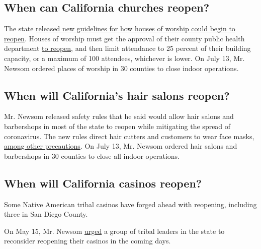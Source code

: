 \hypertarget{when-can-california-churches-reopen}{%
\subsection{When can California churches
reopen?}\label{when-can-california-churches-reopen}}

The state
\href{https://covid19.ca.gov/pdf/guidance-places-of-worship.pdf}{released
new guidelines for how houses of worship could begin to reopen}. Houses
of worship must get the approval of their county public health
department
\href{https://www.nytimes3xbfgragh.onion/2020/05/25/world/coronavirus-news-cases-deaths.html\#link-8d1a66e}{to
reopen}, and then limit attendance to 25 percent of their building
capacity, or a maximum of 100 attendees, whichever is lower. On July 13,
Mr. Newsom ordered places of worship in 30 counties to close indoor
operations.

\hypertarget{when-will-californias-hair-salons-reopen}{%
\subsection{When will California's hair salons
reopen?}\label{when-will-californias-hair-salons-reopen}}

Mr. Newsom released safety rules that he said would allow hair salons
and barbershops in most of the state to reopen while mitigating the
spread of coronavirus. The new rules direct hair cutters and customers
to wear face masks,
\href{https://covid19.ca.gov/pdf/guidance-hair-salons.pdf}{among other
precautions}. On July 13, Mr. Newsom ordered hair salons and barbershops
in 30 counties to close all indoor operations.

\hypertarget{when-will-california-casinos-reopen}{%
\subsection{When will California casinos
reopen?}\label{when-will-california-casinos-reopen}}

Some Native American tribal casinos have forged ahead with reopening,
including three in San Diego County.

On May 15, Mr. Newsom
\href{https://www.latimes.com/california/story/2020-05-15/california-tribal-casinos-urged-by-newsom-to-remain-closed-with-current-coronavirus-fears}{urged}
a group of tribal leaders in the state to reconsider reopening their
casinos in the coming days.

\href{https://www.nytimes3xbfgragh.onion/news-event/coronavirus?action=click\&pgtype=Article\&state=default\&region=MAIN_CONTENT_3\&context=storylines_faq}{}

